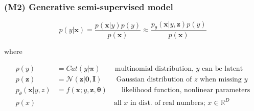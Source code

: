 \documentclass{beamer}
\begin{document}
\begin{frame}
  \frametitle{(M2) Generative semi-supervised model}

  \[
  p(y|\mathbf{x}) = \frac{p(\mathbf{x}|y) p(y)}{p(\mathbf{x})} \approx
  \frac{p_\theta (\mathbf{x}|y, \mathbf{z}) p(y)}{p(\mathbf{x})}
  \]

  where

  \begin{align*}
    p(y) &= Cat(y|\mathbf{\pi}) \qquad \text{multinomial distribution, $y$ can be latent} \\
    p(\mathbf{z}) &= \mathcal{N}(\mathbf{z|0,I}) \qquad
    \text{Gaussian distribution of $z$ when missing $y$} \\
    p_\theta (\mathbf{x}|y,z) &= f(\mathbf{x};y,\mathbf{z},\mathbf{\theta})
    \qquad \text{likelihood function, nonlinear parameters} \\
    p(x) & \qquad \qquad \qquad \qquad \text{all $x$ in dist. of real numbers;  $x \in \mathbb{R}^{D}$}
    \end{align*}
  
  \end{frame}
 
\end{document}
